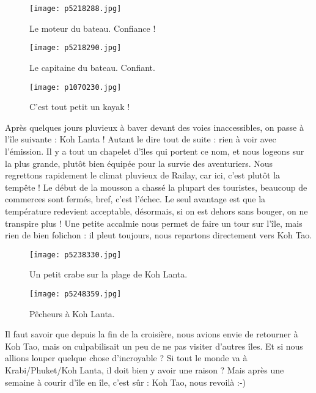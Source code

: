 \documentclass{book}
\begin{document}
\begin{figure}[h]
\centering
\texttt{[image: p5218288.jpg]}
\caption*{Le moteur du bateau. Confiance !}
\end{figure}


\begin{figure}[h]
\centering
\texttt{[image: p5218290.jpg]}
\caption*{Le capitaine du bateau. Confiant.}
\end{figure}


\begin{figure}[h]
\centering
\texttt{[image: p1070230.jpg]}
\caption*{C'est tout petit un kayak !}
\end{figure}

Après quelques jours pluvieux à baver devant des voies inaccessibles, on passe à l'île suivante : Koh Lanta ! Autant le dire tout de suite : rien à voir avec l'émission. Il y a tout un chapelet d'îles qui portent ce nom, et nous logeons sur la plus grande, plutôt bien équipée pour la survie des aventuriers. Nous regrettons rapidement le climat pluvieux de Railay, car ici, c'est plutôt la tempête ! Le début de la mousson a chassé la plupart des touristes, beaucoup de commerces sont fermés, bref, c'est l'échec. Le seul avantage est que la température redevient acceptable, désormais, si on est dehors sans bouger, on ne transpire plus ! Une petite accalmie nous permet de faire un tour sur l'île, mais rien de bien folichon : il pleut toujours, nous repartons directement vers Koh Tao.


\begin{figure}[h]
\centering
\texttt{[image: p5238330.jpg]}
\caption*{Un petit crabe sur la plage de Koh Lanta.}
\end{figure}


\begin{figure}[h]
\centering
\texttt{[image: p5248359.jpg]}
\caption*{Pêcheurs à Koh Lanta.}
\end{figure}

Il faut savoir que depuis la fin de la croisière, nous avions envie de retourner à Koh Tao, mais on culpabilisait un peu de ne pas visiter d'autres îles. Et si nous allions louper quelque chose d'incroyable ? Si tout le monde va à Krabi/Phuket/Koh Lanta, il doit bien y avoir une raison ? Mais après une semaine à courir d'île en île, c'est sûr : Koh Tao, nous revoilà :-)
\end{document}
